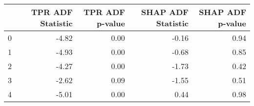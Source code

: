 \begin{tabular}{lrrrr}
\toprule
 & TPR ADF Statistic & TPR ADF p-value & SHAP ADF Statistic & SHAP ADF p-value \\
\midrule
0 & -4.82 & 0.00 & -0.16 & 0.94 \\
1 & -4.93 & 0.00 & -0.68 & 0.85 \\
2 & -4.27 & 0.00 & -1.73 & 0.42 \\
3 & -2.62 & 0.09 & -1.55 & 0.51 \\
4 & -5.01 & 0.00 & 0.44 & 0.98 \\
\bottomrule
\end{tabular}
